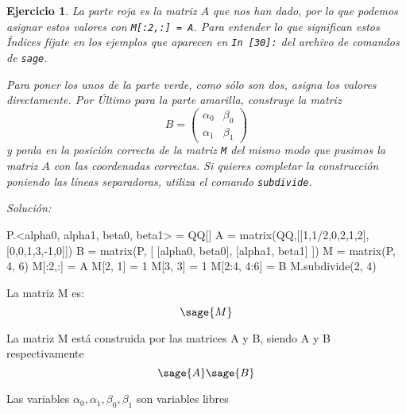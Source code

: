 \documentclass{amsart}
\newtheorem{ejer}{Ejercicio}
\begin{document}
\begin{ejer}
La parte roja es la matriz $A$ que nos han dado, por lo que podemos asignar 
estos valores con \verb|M[:2,:] = A|. Para entender lo que significan estos Índices
fíjate en los ejemplos que aparecen en {\tt In [30]:} del archivo de comandos
de \verb|sage|.

Para poner los unos de la parte verde, como sólo son dos, asigna los valores 
directamente. Por Último para la parte amarilla, construye la matriz 
$$ B = \left(\begin{array}{cc} \alpha_0 & \beta_0 \\ \alpha_1 & \beta_1 
\end{array}\right)$$
y ponla en la posición correcta de la matriz \verb|M| del mismo modo que pusimos
la matriz $A$ con las coordenadas correctas. Si quieres completar la construcción
poniendo las líneas separadoras, utiliza el comando \verb|subdivide|.
\end{ejer}
{\it Solución: }


\begin{sageblock}
P.<alpha0, alpha1, beta0, beta1> = QQ[]
A = matrix(QQ,[[1,1/2,0,2,1,2],[0,0,1,3,-1,0]])
B = matrix(P, [ [alpha0, beta0], [alpha1, beta1] ])
M = matrix(P, 4, 6)
M[:2,:] = A
M[2, 1] = 1
M[3, 3] = 1
M[2:4, 4:6] = B
M.subdivide(2, 4)
\end{sageblock}

La matriz M es: $$\sage{M}$$

La matriz M está construida por las matrices A y B, siendo A y B respectivamente $$\sage{A} \sage{B}$$

Las variables $\alpha_0,\alpha_1,\beta_0,\beta_1$ son variables libres


\end{document}
